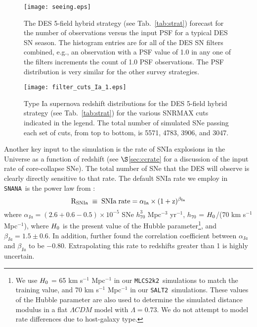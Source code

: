 \documentclass[preprint2]{aastex}    %
\newcommand\be{\begin{equation}}
\newcommand\ee{\end{equation}}
\newcommand{\mlcs}{{\tt MLCS2k2}}
\newcommand{\salt}{{\tt SALT2}}
\newcommand{\snana}{{\tt SNANA}}
\begin{document}
\begin{figure}[ht]
\centerline{\texttt{[image: seeing.eps]}}
\caption{The DES 5-field hybrid strategy (see Tab.~\ref{tab:strat})
forecast for the number of observations versus the input PSF for a 
typical DES SN season. The histogram entries are for all of the DES SN filters combined,
e.g., an observation with a PSF value of 1.0 in any one of the filters 
increments the count of 1.0 PSF observations. The PSF distribution is 
very similar for the other survey strategies.}
\label{fig:psf}
\end{figure}

\begin{figure}[t]
\centerline{\texttt{[image: filter\_cuts\_Ia\_1.eps]}}
\caption{
Type Ia supernova redshift distributions for the DES 5-field hybrid strategy (see Tab.~\ref{tab:strat}) 
for the various SNRMAX cuts indicated in the legend. The total number of 
simulated SNe passing each set of cuts, from top to bottom, is 5571, 4783, 3906, and 3047.
}
\label{fig:cutsIa}
\end{figure}

Another key input to the simulation is the rate of SNIa explosions in the Universe as a 
function of redshift (see $\S$\ref{sec:ccrate} for a discussion of the input rate of core-collapse SNe). The total number of SNe that the DES will observe is clearly directly 
sensitive to that rate. The default SNIa rate we employ in \snana\ is the power law 
from \cite{dil08}:
\be
\rm{R_{SNIa}\;\equiv\;SNIa\;rate} = \alpha_{Ia}\times(1+z)^{\beta_{Ia}}
\label{eqn:rate}
\ee
where $\alpha_{Ia} = (2.6 + 0.6 - 0.5)\times 10^{-5}$ SNe $h_{70}^{3}$ 
Mpc$^{-3}$ yr$^{-1}$, $h_{70}$ = $H_{\rm 0}$/(70 km s$^{-1}$ Mpc$^{-1}$), where $H_{\rm 0}$ 
is the present value of the Hubble parameter\footnote{We use 
$H_{\rm 0}$ = 65 km s$^{-1}$ Mpc$^{-1}$ in our \mlcs\ simulations to match 
the training value, and 70 km s$^{-1}$ Mpc$^{-1}$ in our \salt\ simulations.
These values of the Hubble parameter are also used to determine the simulated
distance modulus in a flat $\Lambda CDM$ model with $\Lambda =0.73$. We 
do not attempt to model rate differences due to host-galaxy type.}, and $\beta_{Ia} = 1.5 \pm 0.6$. 
In addition, \cite{dil08} further found the correlation coefficient between $\alpha_{Ia}$ 
and $\beta_{Ia}$ to be $-$0.80. Extrapolating this rate to redshifts greater than 1 
is highly uncertain. 
\end{document}
